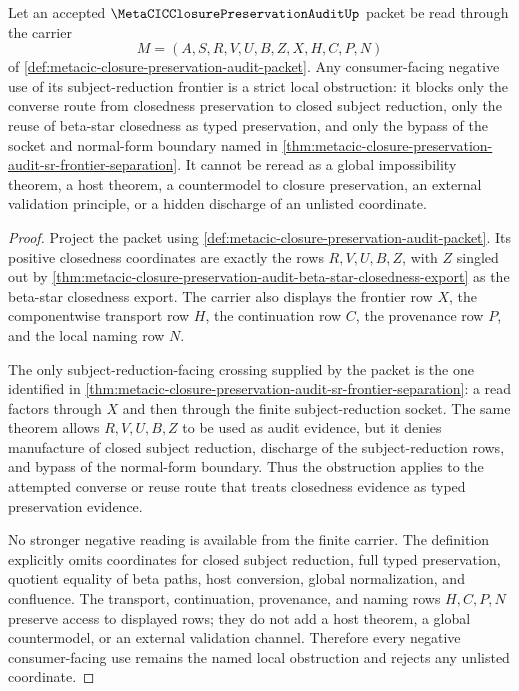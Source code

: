 \begin{corollary}
\label{cor:metacic-closure-preservation-audit-strict-local-obstruction}
Let an accepted $\MetaCICClosurePreservationAuditUp$ packet be read through the carrier
$$
M=(A,S,R,V,U,B,Z,X,H,C,P,N)
$$
of \autoref{def:metacic-closure-preservation-audit-packet}. Any consumer-facing negative use of its subject-reduction frontier is a strict local obstruction: it blocks only the converse route from closedness preservation to closed subject reduction, only the reuse of beta-star closedness as typed preservation, and only the bypass of the socket and normal-form boundary named in \autoref{thm:metacic-closure-preservation-audit-sr-frontier-separation}. It cannot be reread as a global impossibility theorem, a host theorem, a countermodel to closure preservation, an external validation principle, or a hidden discharge of an unlisted coordinate.
\end{corollary}
\begin{proof}
Project the packet using \autoref{def:metacic-closure-preservation-audit-packet}. Its positive closedness coordinates are exactly the rows $R,V,U,B,Z$, with $Z$ singled out by \autoref{thm:metacic-closure-preservation-audit-beta-star-closedness-export} as the beta-star closedness export. The carrier also displays the frontier row $X$, the componentwise transport row $H$, the continuation row $C$, the provenance row $P$, and the local naming row $N$.

The only subject-reduction-facing crossing supplied by the packet is the one identified in \autoref{thm:metacic-closure-preservation-audit-sr-frontier-separation}: a read factors through $X$ and then through the finite subject-reduction socket. The same theorem allows $R,V,U,B,Z$ to be used as audit evidence, but it denies manufacture of closed subject reduction, discharge of the subject-reduction rows, and bypass of the normal-form boundary. Thus the obstruction applies to the attempted converse or reuse route that treats closedness evidence as typed preservation evidence.

No stronger negative reading is available from the finite carrier. The definition explicitly omits coordinates for closed subject reduction, full typed preservation, quotient equality of beta paths, host conversion, global normalization, and confluence. The transport, continuation, provenance, and naming rows $H,C,P,N$ preserve access to displayed rows; they do not add a host theorem, a global countermodel, or an external validation channel. Therefore every negative consumer-facing use remains the named local obstruction and rejects any unlisted coordinate.
\end{proof}
